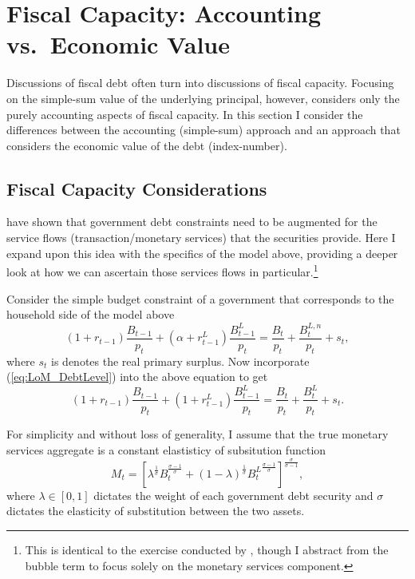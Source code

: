 \documentclass[11pt,a4paper,margin=1.5in]{article}
\begin{document}


\section{Fiscal Capacity: Accounting vs.\ Economic Value}
\label{sec:FiscalCapacity}
Discussions of fiscal debt often turn into discussions of fiscal capacity.
Focusing on the simple-sum value of the underlying principal, however, considers only the purely accounting aspects of fiscal capacity.
In this section I consider the differences between the accounting (simple-sum) approach and an approach that considers the economic value of the debt (index-number).

\subsection{Fiscal Capacity Considerations}
\label{subsec:Theory_Capacity}
\citet*{Brunnermeier-Merkel-Sannikov:2022} have shown that government debt constraints need to be augmented for the service flows (transaction/monetary services) that the securities provide.
Here I expand upon this idea with the specifics of the model above, providing a deeper look at how we can ascertain those services flows in particular.\footnote{
	This is identical to the exercise conducted by \citet{Brunnermeier-Merkel-Sannikov:2020}, though I abstract from the bubble term to focus solely on the monetary services component.}

	Consider the simple budget constraint of a government that corresponds to the household side of the model above
\begin{equation*}
	(1+r_{t-1})\frac{B_{t-1}}{p_t} + (\alpha + r^L_{t-1})\frac{B^L_{t-1}}{p_t} = \frac{B_t}{p_t} + \frac{B^{L,n}_t}{p_t} + s_t,
\end{equation*}
where $s_t$ is denotes the real primary surplus. 
Now incorporate (\ref{eq:LoM_DebtLevel}) into the above equation to get
\begin{equation}
	(1+r_{t-1})\frac{B_{t-1}}{p_t} + (1 + r^L_{t-1})\frac{B^L_{t-1}}{p_t} = \frac{B_t}{p_t} + \frac{B^{L}_t}{p_t} + s_t.
	\label{eq:Gov_PeriodBudget}
\end{equation}

For simplicity and without loss of generality, I assume that the true monetary services aggregate is a constant elastisticy of subsitution function
\begin{equation}
	M_t = \left[\lambda^{\frac{1}{\sigma}}B_t^{\frac{\sigma-1}{\sigma}} + (1-\lambda)^{\frac{1}{\sigma}}{B^L_t}^{\frac{\sigma-1}{\sigma}}\right]^{\frac{\sigma}{\sigma-1}},
	\label{eq:MS_CES}
\end{equation}
where $\lambda \in [0,1]$ dictates the weight of each government debt security and $\sigma$ dictates the elasticity of substitution between the two assets.
\end{document}
